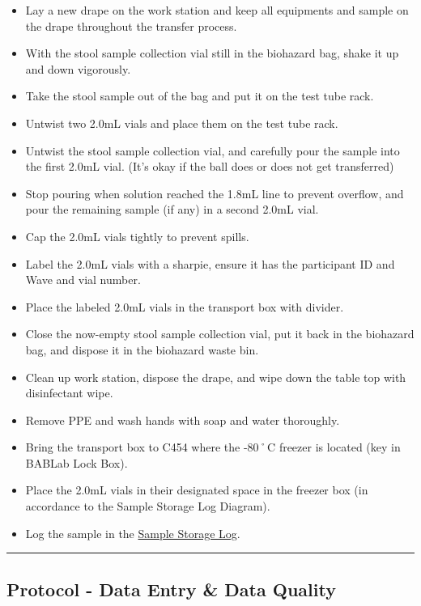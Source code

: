 \documentclass[]{book}
\providecommand{\tightlist}{%
  \setlength{\itemsep}{0pt}\setlength{\parskip}{0pt}}
\begin{document}
\begin{itemize}
\tightlist
\item
  Lay a new drape on the work station and keep all equipments and sample on the drape throughout the transfer process.
\item
  With the stool sample collection vial still in the biohazard bag, shake it up and down vigorously.
\item
  Take the stool sample out of the bag and put it on the test tube rack.
\item
  Untwist two 2.0mL vials and place them on the test tube rack.
\item
  Untwist the stool sample collection vial, and carefully pour the sample into the first 2.0mL vial. (It's okay if the ball does or does not get transferred)
\item
  Stop pouring when solution reached the 1.8mL line to prevent overflow, and pour the remaining sample (if any) in a second 2.0mL vial.
\item
  Cap the 2.0mL vials tightly to prevent spills.
\item
  Label the 2.0mL vials with a sharpie, ensure it has the participant ID and Wave and vial number.
\item
  Place the labeled 2.0mL vials in the transport box with divider.
\item
  Close the now-empty stool sample collection vial, put it back in the biohazard bag, and dispose it in the biohazard waste bin.
\item
  Clean up work station, dispose the drape, and wipe down the table top with disinfectant wipe.
\item
  Remove PPE and wash hands with soap and water thoroughly.
\item
  Bring the transport box to C454 where the -80˚C freezer is located (key in BABLab Lock Box).
\item
  Place the 2.0mL vials in their designated space in the freezer box (in accordance to the Sample Storage Log Diagram).
\item
  Log the sample in the \href{https://app.box.com/file/630322897864}{Sample Storage Log}.
\end{itemize}

\begin{center}\rule{0.5\linewidth}{0.5pt}\end{center}

\hypertarget{protocol---data-entry-data-quality}{%
\subsection{Protocol - Data Entry \& Data Quality}\label{protocol---data-entry-data-quality}}
\end{document}
